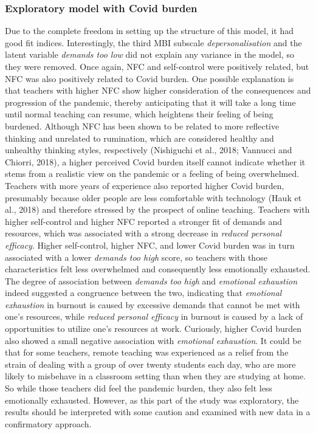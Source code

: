 \documentclass[
  english,
  man,floatsintext]{apa6}
\begin{document}
\hypertarget{exploratory-model-with-covid-burden}{%
\subsubsection{Exploratory model with Covid burden}\label{exploratory-model-with-covid-burden}}

Due to the complete freedom in setting up the structure of this model, it had good fit indices.
Interestingly, the third MBI subscale \emph{depersonalisation} and the latent variable \emph{demands too low} did not explain any variance in the model, so they were removed.
Once again, NFC and self-control were positively related, but NFC was also positively related to Covid burden.
One possible explanation is that teachers with higher NFC show higher consideration of the consequences and progression of the pandemic, thereby anticipating that it will take a long time until normal teaching can resume, which heightens their feeling of being burdened.
Although NFC has been shown to be related to more reflective thinking and unrelated to rumination, which are considered healthy and unhealthy thinking styles, respectively (Nishiguchi et al., 2018; Vannucci and Chiorri, 2018), a higher perceived Covid burden itself cannot indicate whether it stems from a realistic view on the pandemic or a feeling of being overwhelmed.
Teachers with more years of experience also reported higher Covid burden, presumably because older people are less comfortable with technology (Hauk et al., 2018) and therefore stressed by the prospect of online teaching.
Teachers with higher self-control and higher NFC reported a stronger fit of demands and resources, which was associated with a strong decrease in \emph{reduced personal efficacy}.
Higher self-control, higher NFC, and lower Covid burden was in turn associated with a lower \emph{demands too high} score, so teachers with those characteristics felt less overwhelmed and consequently less emotionally exhausted.
The degree of association between \emph{demands too high} and \emph{emotional exhaustion} indeed suggested a congruence between the two, indicating that \emph{emotional exhaustion} in burnout is caused by excessive demands that cannot be met with one's resources, while \emph{reduced personal efficacy} in burnout is caused by a lack of opportunities to utilize one's resources at work.
Curiously, higher Covid burden also showed a small negative association with \emph{emotional exhaustion}.
It could be that for some teachers, remote teaching was experienced as a relief from the strain of dealing with a group of over twenty students each day, who are more likely to misbehave in a classroom setting than when they are studying at home.
So while those teachers did feel the pandemic burden, they also felt less emotionally exhausted.
However, as this part of the study was exploratory, the results should be interpreted with some caution and examined with new data in a confirmatory approach.
\end{document}

